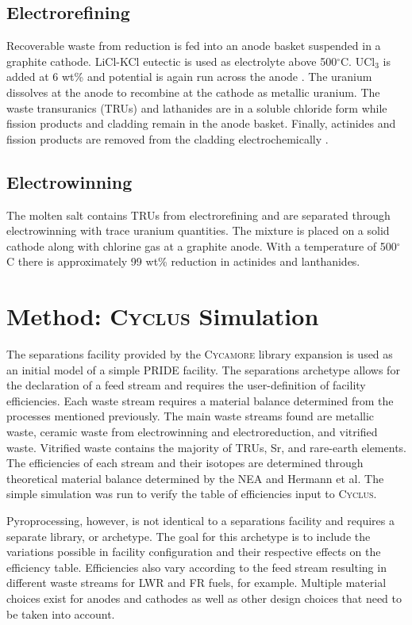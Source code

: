 \documentclass{anstrans}
\newcommand{\Cyclus}{\textsc{Cyclus}\xspace}%
\newcommand{\Cycamore}{\textsc{Cycamore}\xspace}%
\begin{document}
\subsection{Electrorefining}

Recoverable waste from reduction is fed into an anode basket suspended in a graphite cathode. LiCl-KCl eutectic is used as electrolyte above 500$^{\circ}$C. UCl$_3$ is added at 6 wt\% and potential is again run across the anode \cite{flowsheet_1998,lee_korean_2011}. The uranium dissolves at the anode to recombine at the cathode as metallic uranium. The waste transuranics (TRUs) and lathanides are in a soluble chloride form  while fission products and cladding remain in the anode basket. Finally, actinides and fission products are removed from the cladding electrochemically \cite{lee_korean_2011}.

\subsection{Electrowinning}

The molten salt contains TRUs from electrorefining and are separated through electrowinning with trace uranium quantities. The mixture is placed on a solid cathode along with chlorine gas at a graphite anode. With a temperature of 500$^{\circ}$C there is approximately 99 wt\% reduction in actinides and lanthanides. 
\section{Method: \Cyclus Simulation}
The separations facility provided by the \Cycamore library expansion is used as an initial model of a simple PRIDE facility. The separations archetype allows for the declaration of a feed stream and requires the user-definition of facility efficiencies. Each waste stream requires a material balance determined from the processes mentioned previously. The main waste streams found are metallic waste, ceramic waste from electrowinning and electroreduction, and vitrified waste. Vitrified waste contains the majority of TRUs, Sr, and rare-earth elements. The efficiencies of each stream and their isotopes are determined through theoretical material balance determined by the NEA and Hermann et al\cite{flowsheet_1998,herrmann_separation_2010}. The simple simulation was run to verify the table of efficiencies input to \Cyclus.

Pyroprocessing, however, is not identical to a separations facility and requires a separate library, or archetype. The goal for this archetype is to include the variations possible in facility configuration and their respective effects on the efficiency table. Efficiencies also vary according to the feed stream resulting in different waste streams for LWR and FR fuels, for example. Multiple material choices exist for anodes and cathodes as well as other design choices that need to be taken into account. 
\end{document}
